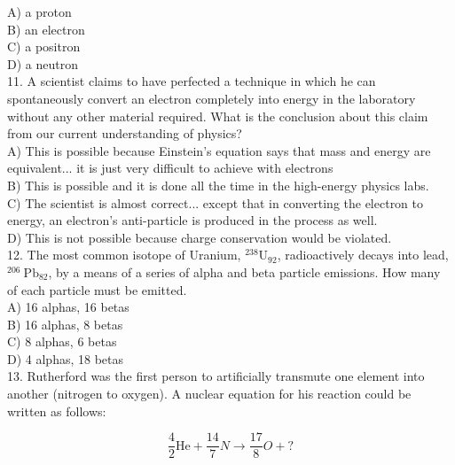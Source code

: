 \begin{enumerate}
A) a proton\\
B) an electron\\
C) a positron\\
D) a neutron\\
11. A scientist claims to have perfected a technique in which he can spontaneously convert an electron completely into energy in the laboratory without any other material required. What is the conclusion about this claim from our current understanding of physics?\\
A) This is possible because Einstein's equation says that mass and energy are equivalent... it is just very difficult to achieve with electrons\\
B) This is possible and it is done all the time in the high-energy physics labs.\\
C) The scientist is almost correct... except that in converting the electron to energy, an electron's anti-particle is produced in the process as well.\\
D) This is not possible because charge conservation would be violated.\\
12. The most common isotope of Uranium, ${ }^{238} \mathrm{U}_{92}$, radioactively decays into lead, ${ }^{206} \mathrm{~Pb}_{82}$, by a means of a series of alpha and beta particle emissions. How many of each particle must be emitted.\\
A) 16 alphas, 16 betas\\
B) 16 alphas, 8 betas\\
C) 8 alphas, 6 betas\\
D) 4 alphas, 18 betas\\
13. Rutherford was the first person to artificially transmute one element into another (nitrogen to oxygen). A nuclear equation for his reaction could be written as follows:

$$
\frac{4}{2} \mathrm{He}+\frac{14}{7} N \rightarrow \frac{17}{8} O+?
$$


\end{enumerate}
